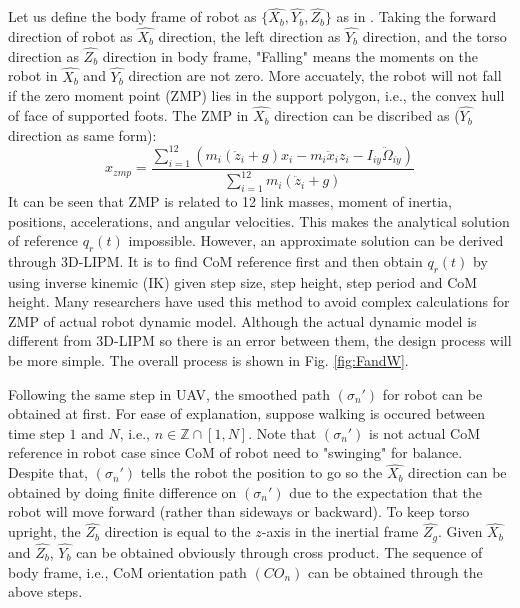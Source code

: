 \documentclass{ieeeaccess}
\begin{document}
Let us define the body frame of robot as $\{ \widehat{X_b}, \widehat{Y_b}, \widehat{Z_b} \}$ as in \cite{ourrobot}. Taking the forward direction of robot as $\widehat{X_b}$ direction, the left direction as $\widehat{Y_b}$ direction, and the torso direction as $\widehat{Z_b}$ direction in body frame, "Falling" means the moments on the robot in $\widehat{X_b}$ and $\widehat{Y_b}$ direction are not zero. More accuately, the robot will not fall if the zero moment point (ZMP) lies in the support polygon, i.e., the convex hull of face of supported foots. The ZMP in $\widehat{X_b}$ direction can be discribed as \cite{huang2001planning} ($\widehat{Y_b}$ direction as same form):
\begin{equation}
    x_{zmp} = \frac{\sum_{i=1}^{12} (m_i(\ddot{z}_i+g)x_i - m_i\ddot{x}_iz_i - I_{iy}\ddot{\Omega}_{iy})}
                   {\sum_{i=1}^{12} m_i(\ddot{z}_i+g)}
\end{equation}
It can be seen that ZMP is related to 12 link masses, moment of inertia, positions, accelerations, and angular velocities. This makes the analytical solution of reference $q_r(t)$ impossible. However, an approximate solution can be derived through 3D-LIPM. It is to find CoM reference first and then obtain $q_r(t)$ by using inverse kinemic (IK) given step size, step height, step period and CoM height. Many researchers have used this method to avoid complex calculations for ZMP of actual robot dynamic model. Although the actual dynamic model is different from 3D-LIPM so there is an error between them, the design process will be more simple. The overall process is shown in Fig. \ref{fig:FandW}.

Following the same step in UAV, the smoothed path $(\sigma_n')$ for robot can be obtained at first. For ease of explanation, suppose walking is occured between time step $1$ and $N$, i.e., $n\in\mathbb{Z}\cap[1,N]$. Note that $(\sigma_n')$ is not actual CoM reference in robot case since CoM of robot need to "swinging" for balance. Despite that, $(\sigma_n')$ tells the robot the position to go so the $\widehat{X_b}$ direction can be obtained by doing finite difference on $(\sigma_n')$ due to the expectation that the robot will move forward (rather than sideways or backward). To keep torso upright, the $\widehat{Z_b}$ direction is equal to the $z$-axis in the inertial frame $\widehat{Z_g}$. Given $\widehat{X_b}$ and $\widehat{Z_b}$, $\widehat{Y_b}$ can be obtained obviously through cross product. The sequence of body frame, i.e., CoM orientation path $(CO_n)$ can be obtained through the above steps.
\end{document}
